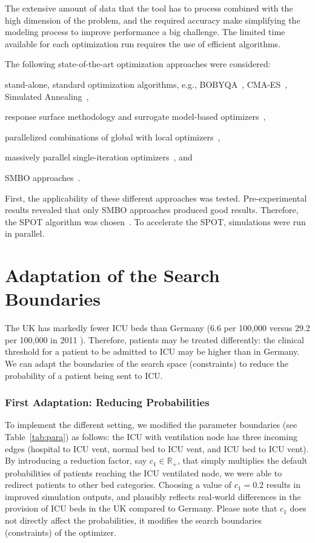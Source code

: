 \documentclass[conference]{IEEEtran}
\begin{document}
The extensive amount of data that the tool has to process combined with the high dimension of the problem, and the required accuracy make simplifying the modeling process to improve performance a big challenge.
The limited time available for each optimization run requires the use of efficient algorithms.

The following state-of-the-art optimization approaches were considered: 
\begin{compactitem}
\item stand-alone, standard optimization algorithms, e.g., BOBYQA~\citep{Powe09a}, CMA-ES~\citep{Hans06a}, Simulated Annealing~\citep{vanL87a},
\item response surface methodology and surrogate model-based optimizers~\citep{Myers2016}, 
\item parallelized  combinations of global with local optimizers~\citet{Good18b},  
\item massively parallel single-iteration optimizers~\citet{Cauw20a}\citet{Rena20a}, and 
\item \gls{SMBO} approaches~\citep{Jin11a}.
\end{compactitem}
First, the applicability of these different approaches  was tested. Pre-experimental results revealed that only \gls{SMBO} approaches produced good results. 
Therefore, the \gls{SPOT} algorithm was chosen~\citep{Bart17parxiv}.
To accelerate the \gls{SPOT}, simulations were run in parallel. 

\section{Adaptation of the Search Boundaries}\label{sec:adaptation}
The UK has markedly fewer ICU beds than Germany (6.6 per 100,000 versus 29.2 per 100,000 in 2011  \cite{rhodes_variability_2012}).
Therefore, patients may be treated differently: the clinical threshold for a patient to be admitted to ICU may be higher than in Germany. We can adapt the boundaries of the search space (constraints) to reduce the probability of a patient being sent to \gls{ICU}.

\subsubsection{First Adaptation: Reducing Probabilities}
To implement the different setting, we modified the parameter boundaries (see Table~\ref{tab:para})  as follows: the ICU with ventilation node has three incoming edges (hospital to ICU vent, normal bed to ICU vent, and ICU bed to ICU vent).
By introducing a reduction factor, say  $c_1 \in \mathbb{R_+}$, that simply multiplies the default probabilities of patients reaching the ICU ventilated node, we were able to redirect patients to other bed categories. 
Choosing a value of $c_1=0.2$ results in improved simulation outputs, and plausibly reflects real-world differences in the provision of ICU beds in the UK compared to Germany. Please note that $c_1$ does not directly affect the probabilities, it modifies the search boundaries (constraints) of the optimizer.
\end{document}
